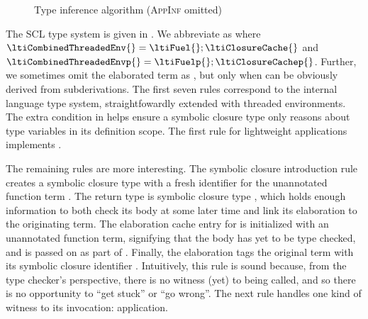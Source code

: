 \begin{figure}
  \caption{Type inference algorithm (\textsc{AppInf} omitted)
  }
  \label{symbolic:figure:SC-language-algorithmic-type-system}
\end{figure}

The SCL type system is given in .
We abbreviate
    \ltitSstkjudgement{\ltimakeCombinedThreadedEnv{\ltiFuel{}}{\ltiClosureCache{}}}
                      {\ltiEnv{}}
                      {\ltiE{}}
                      {\ltiT{}}
                      {\ltimakeCombinedThreadedEnv{\ltiFuelp{}}{\ltiClosureCachep{}}}
                      {\ltiEp{}}
                      as
    \ltitSstkjudgement{\ltiCombinedThreadedEnv{}}
                      {\ltiEnv{}}
                      {\ltiE{}}
                      {\ltiT{}}
                      {\ltiCombinedThreadedEnvp{}}
                      {\ltiEp{}}
                      where
${\ltiCombinedThreadedEnv{}} = {\ltimakeCombinedThreadedEnv{\ltiFuel{}}{\ltiClosureCache{}}}$
and 
                      ${\ltiCombinedThreadedEnvp{}} = {\ltimakeCombinedThreadedEnv{\ltiFuelp{}}{\ltiClosureCachep{}}}$.
Further, we sometimes omit the elaborated term as
    \ltitSstkjudgementNoElab{\ltiCombinedThreadedEnv{}}
                      {\ltiEnv{}}
                      {\ltiE{}}
                      {\ltiT{}}
                      {\ltiCombinedThreadedEnvp{}}
                      {\ltiEp{}},
                      but only when
                      {\ltiEp{}}
                      can be obviously derived from subderivations.
The first seven rules correspond to the internal language type system,
straightfowardly extended with threaded environments.
The extra condition in \ltiSCAbs
helps ensure a symbolic closure type only reasons about type variables
in its definition scope.
The first rule for lightweight applications \ltiSCAppInfBot implements \ltiEAppInfBot.

The remaining rules are more interesting.
The symbolic closure introduction rule
\ltiSCUAbs creates a symbolic closure type with a fresh identifier \ltiClosureID{}
for the unannotated function term \ltiufun{\ltivar{}}{\ltiE{}}.
The return type is symbolic closure type
                       \ltiClosureWithStkID{\ltiEnv{}}
                                           {\ltiClosureID{}}
                                           {\ltiufun{\ltivar{}}{\ltiE{}}},
which holds enough information to both check its body at some later time
and link its elaboration to the originating term.
The elaboration cache entry for \ltiClosureID{} is initialized 
with an unannotated function term, signifying that the body has yet to be type checked,
and is passed on as part of \ltiCombinedThreadedEnvp{}.
Finally, the elaboration
                      {\ltiufunelab{\ltiClosureID{}}
                                   {\ltivar{}}
                                   {\ltiE{}}}
tags the original term with its symbolic closure identifier \ltiClosureID{}.
Intuitively, this rule is sound because, from the type checker's perspective,
there is no witness (yet) to \ltiufun{\ltivar{}}{\ltiE{}}
being called, and so there is no opportunity to ``get stuck'' or
``go wrong''. 
The next rule handles one kind of witness to its invocation: application.

